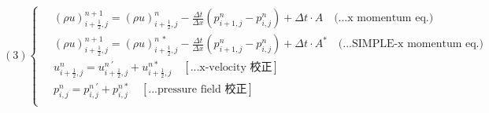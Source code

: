 \documentclass[12pt]{article}
\begin{document}
\begin{equation}
(3)
\left\{
\begin{aligned}
    \ &(\rho u)_{i+\frac{1}{2},j}^{n+1} = (\rho u)_{i+\frac{1}{2},j}^{n} - \frac{\Delta t}{\Delta x}(p_{i+1,j}^{n} - p_{i,j}^{n}) + \Delta t \cdot A  \quad \text{(...x momentum eq.)}\\[1.5ex]
    \ &(\rho u)_{i+\frac{1}{2},j}^{n+1} = (\rho u)_{i+\frac{1}{2},j}^{n\ *} - \frac{\Delta t}{\Delta x}(p_{i+1,j}^{n} - p_{i,j}^{n}) + \Delta t \cdot A^{*}  \quad \text{(...SIMPLE-x momentum eq.)}\\[1.5ex]
    \ &u_{i+\frac{1}{2},j}^{n} = u_{i+\frac{1}{2},j}^{n\ '} + u_{i+\frac{1}{2},j}^{n *}  \quad \left[\text{...x-velocity 校正}\right]\\[1.5ex]
    \ &p_{i,j}^{n} = p_{i,j}^{n\ '} + p_{i,j}^{n *} \quad\left[\text{...pressure field 校正}\right]\\[1.5ex]
\end{aligned}
\right.
\end{equation}
\newpage
\end{document}
